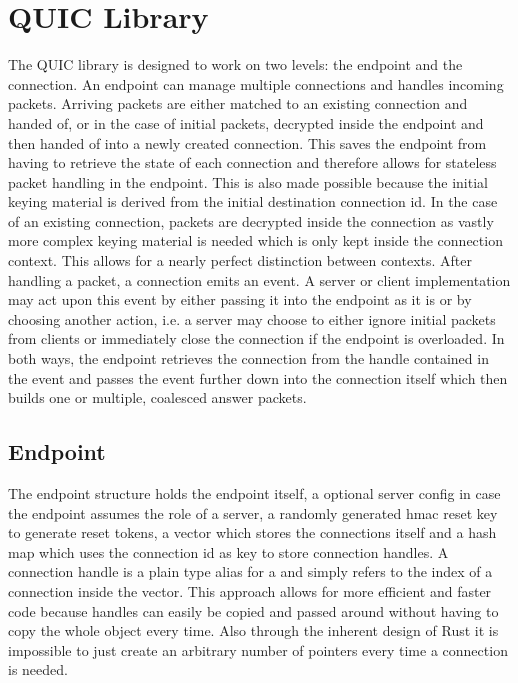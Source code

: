 \section{QUIC Library} \label{quic_lib}

The QUIC library is designed to work on two levels: the endpoint and the connection. An endpoint can manage multiple connections and handles
incoming packets. Arriving packets are either matched to an existing connection and handed of, or in the case of initial packets, decrypted
inside the endpoint and then handed of into a newly created connection. This saves the endpoint from having to retrieve the state of each connection
and therefore allows for stateless packet handling in the endpoint. This is also made possible because the initial keying material is derived
from the initial destination connection id. In the case of an existing connection, packets are decrypted inside the connection as vastly more
complex keying material is needed which is only kept inside the connection context. This allows for a nearly perfect distinction between contexts.
After handling a packet, a connection emits an event. A server or client implementation may act upon this event by either passing it into
the endpoint as it is or by choosing another action, i.e. a server may choose to either ignore initial packets from clients or immediately close
the connection if the endpoint is overloaded. In both ways, the endpoint retrieves the connection from the handle contained in the event and
passes the event further down into the connection itself which then builds one or multiple, coalesced answer packets. 

\subsection{Endpoint}

The endpoint structure holds the endpoint itself, a optional server config in case the endpoint assumes the role of a server, a randomly generated
hmac reset key to generate reset tokens, a vector which stores the connections itself and a hash map which uses the connection id as key to store
connection handles. A connection handle is a plain type alias for a  and simply refers to the index of a connection inside the
vector. This approach allows for more efficient and faster code because handles can easily be copied and passed around without having to copy the
whole  object every time. Also through the inherent design of Rust it is impossible to just create an arbitrary number of
pointers every time a connection is needed. 

